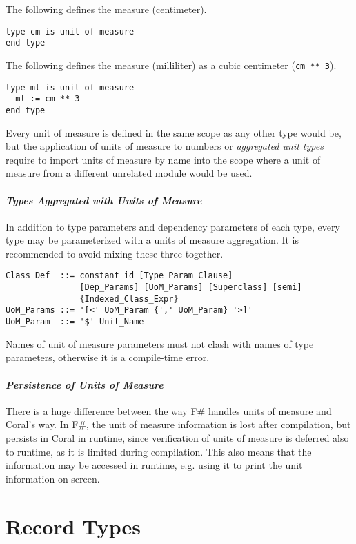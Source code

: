 \example The following defines the measure  (centimeter).
\begin{lstlisting}
type cm is unit-of-measure
end type
\end{lstlisting}

\example The following defines the measure  (milliliter) as a cubic centimeter (\lstinline!cm ** 3!).
\begin{lstlisting}
type ml is unit-of-measure
  ml := cm ** 3
end type
\end{lstlisting}

Every unit of measure is defined in the same scope as any other type would be, but the application of units of measure to numbers or {\em aggregated unit types} require to import units of measure by name into the scope where a unit of measure from a different unrelated module would be used. 

\paragraph{\em Types Aggregated with Units of Measure}
In addition to type parameters and dependency parameters of each type, every type may be parameterized with a units of measure aggregation. It is recommended to avoid mixing these three together. 

\syntax\begin{lstlisting}[mathescape=false]
Class_Def  ::= constant_id [Type_Param_Clause]
               [Dep_Params] [UoM_Params] [Superclass] [semi]
               {Indexed_Class_Expr}
UoM_Params ::= '[<' UoM_Param {',' UoM_Param} '>]'
UoM_Param  ::= '$' Unit_Name
\end{lstlisting}

Names of unit of measure parameters must not clash with names of type parameters, otherwise it is a compile-time error. 

\paragraph{\em Persistence of Units of Measure}
There is a huge difference between the way F\# handles units of measure and Coral's way. In F\#, the unit of measure information is lost after compilation, but persists in Coral in runtime, since verification of units of measure is deferred also to runtime, as it is limited during compilation. This also means that the information may be accessed in runtime, e.g. using it to print the unit information on screen.

\section{Record Types}
\label{sec:record-types}

